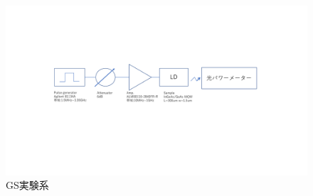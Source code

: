 \begin{figure}[htbp]
	\includegraphics[width=15cm]{figure/fig_2_3_1_01_GS_setup.pdf}
	\caption{GS実験系}
	\label{fig:GS_setup}
\end{figure}

